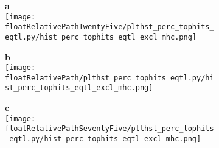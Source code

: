 \begin{figure}[!tbp]

    \begin{subfigure}[]{.32\textwidth}
        \textbf{a}
        \\
        \texttt{[image: \\floatRelativePathTwentyFive/plthst\_perc\_tophits\_eqtl.py/hist\_perc\_tophits\_eqtl\_excl\_mhc.png]}
    \end{subfigure}
%
    \begin{subfigure}[]{.32\textwidth}
        \textbf{b}
        \\
        \texttt{[image: \\floatRelativePath/plthst\_perc\_tophits\_eqtl.py/hist\_perc\_tophits\_eqtl\_excl\_mhc.png]}
    \end{subfigure}
%
    \begin{subfigure}[]{.32\textwidth}
        \textbf{c}
        \\
        \texttt{[image: \\floatRelativePathSeventyFive/plthst\_perc\_tophits\_eqtl.py/hist\_perc\_tophits\_eqtl\_excl\_mhc.png]}
    \end{subfigure}

\caption{}

\end{figure}

%
%

